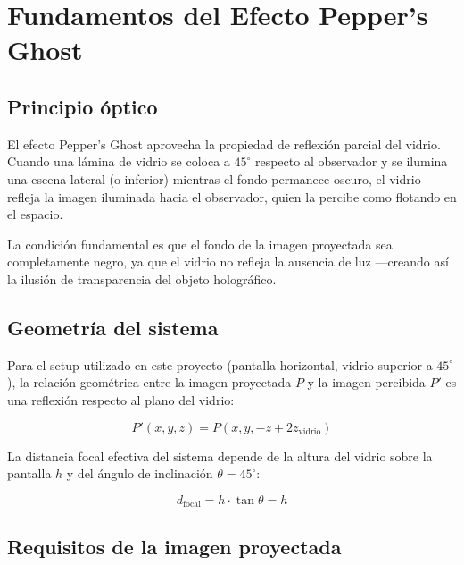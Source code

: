 \documentclass[12pt, a4paper]{article}
\begin{document}
\section{Fundamentos del Efecto Pepper's Ghost}

\subsection{Principio óptico}

El efecto Pepper's Ghost aprovecha la propiedad de reflexión parcial
del vidrio. Cuando una lámina de vidrio se coloca a $45^\circ$ respecto
al observador y se ilumina una escena lateral (o inferior) mientras el
fondo permanece oscuro, el vidrio refleja la imagen iluminada hacia el
observador, quien la percibe como flotando en el espacio.

La condición fundamental es que el fondo de la imagen proyectada sea
completamente negro, ya que el vidrio no refleja la ausencia de luz
—creando así la ilusión de transparencia del objeto holográfico.

\subsection{Geometría del sistema}

Para el setup utilizado en este proyecto (pantalla horizontal, vidrio
superior a $45^\circ$), la relación geométrica entre la imagen
proyectada $P$ y la imagen percibida $P'$ es una reflexión respecto al
plano del vidrio:

\begin{equation}
  P'(x, y, z) = P(x, y, -z + 2z_{\text{vidrio}})
  \label{eq:reflexion}
\end{equation}

La distancia focal efectiva del sistema depende de la altura del
vidrio sobre la pantalla $h$ y del ángulo de inclinación
$\theta = 45^\circ$:

\begin{equation}
  d_{\text{focal}} = h \cdot \tan\theta = h
  \label{eq:focal}
\end{equation}

\subsection{Requisitos de la imagen proyectada}
\end{document}
